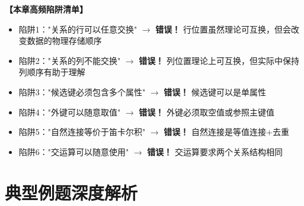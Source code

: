 \documentclass[12pt, a4paper]{article}
\newenvironment{bluebox}[1]{%
  \begin{trivlist}
  \item[\hskip\labelsep \textbf{#1}]
  \setlength{\parskip}{0.5ex}
  \setlength{\itemsep}{0.5ex}
}{%
  \end{trivlist}
}
\begin{document}
\begin{bluebox}{高频陷阱清单}
	\textbf{【本章高频陷阱清单】}

	\begin{itemize}
		\item 陷阱1："关系的行可以任意交换" $\rightarrow$ \textbf{错误！} 行位置虽然理论可互换，但会改变数据的物理存储顺序
		\item 陷阱2："关系的列不能交换" $\rightarrow$ \textbf{错误！} 列位置理论上可互换，但实际中保持列顺序有助于理解
		\item 陷阱3："候选键必须包含多个属性" $\rightarrow$ \textbf{错误！} 候选键可以是单属性
		\item 陷阱4："外键可以随意取值" $\rightarrow$ \textbf{错误！} 外键必须取空值或参照主键值
		\item 陷阱5："自然连接等价于笛卡尔积" $\rightarrow$ \textbf{错误！} 自然连接是等值连接+去重
		\item 陷阱6："交运算可以随意使用" $\rightarrow$ \textbf{错误！} 交运算要求两个关系结构相同
	\end{itemize}
\end{bluebox}

\section{典型例题深度解析}
\end{document}
